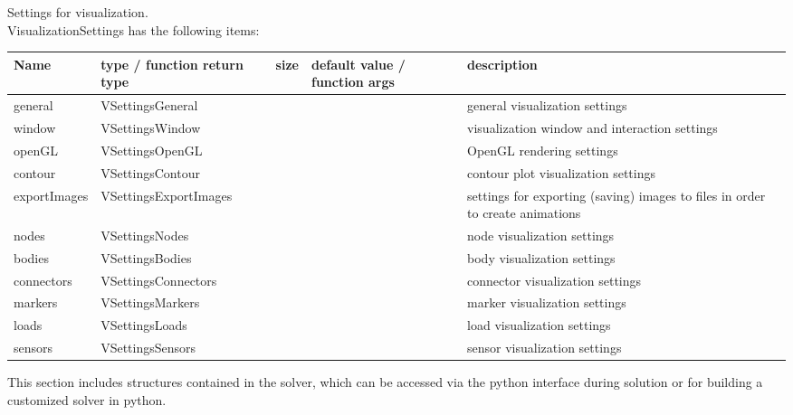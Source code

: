  \label{sec:VisualizationSettings}
Settings for visualization. \\ 
%
VisualizationSettings has the following items:
\begin{center}
  \footnotesize
  \begin{longtable}{| p{4.2cm} | p{2.5cm} | p{0.3cm} | p{3.0cm} | p{6cm} |}
    \hline
    \bf Name & \bf type / function return type & \bf size & \bf default value / function args & \bf description \\ \hline
    general &     VSettingsGeneral &      &      &     general visualization settings\\ \hline
    window &     VSettingsWindow &      &      &     visualization window and interaction settings\\ \hline
    openGL &     VSettingsOpenGL &      &      &     OpenGL rendering settings\\ \hline
    contour &     VSettingsContour &      &      &     contour plot visualization settings\\ \hline
    exportImages &     VSettingsExportImages &      &      &     settings for exporting (saving) images to files in order to create animations\\ \hline
    nodes &     VSettingsNodes &      &      &     node visualization settings\\ \hline
    bodies &     VSettingsBodies &      &      &     body visualization settings\\ \hline
    connectors &     VSettingsConnectors &      &      &     connector visualization settings\\ \hline
    markers &     VSettingsMarkers &      &      &     marker visualization settings\\ \hline
    loads &     VSettingsLoads &      &      &     load visualization settings\\ \hline
    sensors &     VSettingsSensors &      &      &     sensor visualization settings\\ \hline
	  \end{longtable}
	\end{center}

\label{sec:solverSubstructures}
This section includes structures contained in the solver, which can be accessed via the python interface during solution or for building a customized solver in python.

